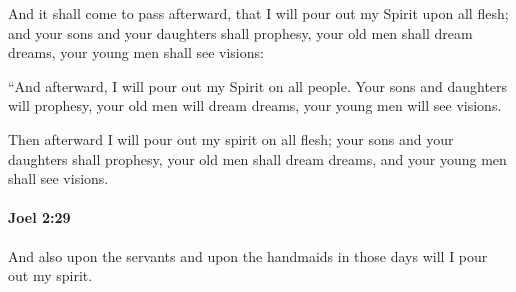			\begin{versebox}
					\item[BHS] 
					\item[LXX] 
					\item[ASV] And it shall come to pass afterward, that I will pour out my Spirit upon all flesh; and your sons and your daughters shall prophesy, your old men shall dream dreams, your young men shall see visions:
					\item[NIV] “And afterward, I will pour out my Spirit on all people. Your sons and daughters will prophesy, your old men will dream dreams, your young men will see visions.
					\item[NRSV] Then afterward I will pour out my spirit on all flesh; your sons and your daughters shall prophesy, your old men shall dream dreams, and your young men shall see visions.
			\end{versebox}

		\paragraph{Joel 2:29} %
			\label{JOEL-2-29}

			And also upon the servants and upon the handmaids in those days will I pour out my spirit.

